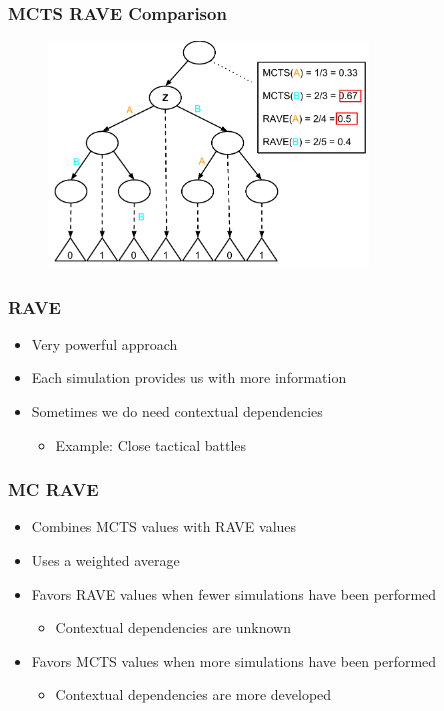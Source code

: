 \documentclass{beamer}
\begin{document}
\begin{frame}[fragile]
\frametitle{MCTS RAVE Comparison}
\begin{figure}[h]
	\includegraphics[width=8.5cm]{Diagrams/Rave/RAVEDiagramComparison.pdf}
	\centering
\end{figure}
\end{frame}


\begin{frame}
\frametitle{RAVE}
\begin{itemize}
	\item Very powerful approach
	\item Each simulation provides us with more information
	\item Sometimes we do need contextual dependencies
	\begin{itemize}
		\item Example: Close tactical battles
	\end{itemize}
\end{itemize}
\end{frame}

\begin{frame}
\frametitle{MC RAVE}
\begin{itemize}
	\item Combines MCTS values with RAVE values
	\item Uses a weighted average
	\item Favors RAVE values when fewer simulations have been performed
	\begin{itemize}
		\item Contextual dependencies are unknown
	\end{itemize}
	\item Favors MCTS values when more simulations have been performed
	\begin{itemize}
		\item Contextual dependencies are more developed
	\end{itemize}
\end{itemize}
\end{frame}
\end{document}
